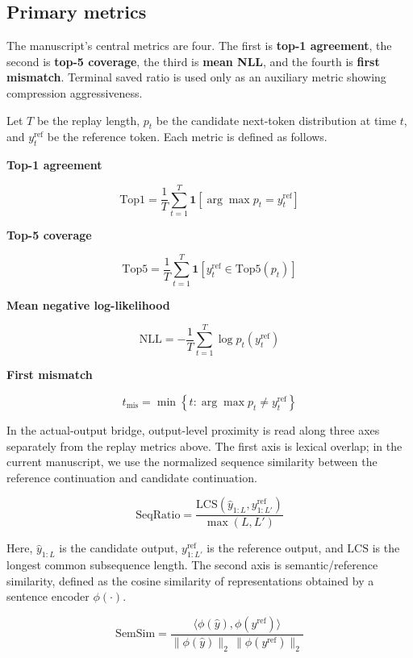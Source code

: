 \subsection{Primary metrics}


The manuscript's central metrics are four. The first is \textbf{top-1 agreement}, the second is \textbf{top-5 coverage}, the third is \textbf{mean NLL}, and the fourth is \textbf{first mismatch}. Terminal saved ratio is used only as an auxiliary metric showing compression aggressiveness.


Let $T$ be the replay length, $p_t$ be the candidate next-token distribution at time $t$, and $y_t^{\mathrm{ref}}$ be the reference token. Each metric is defined as follows.


\textbf{Top-1 agreement}


$$
\mathrm{Top1}
=
\frac{1}{T}
\sum_{t=1}^{T}
\mathbf{1}\left[\arg\max p_t = y_t^{\mathrm{ref}}\right]
$$


\textbf{Top-5 coverage}


$$
\mathrm{Top5}
=
\frac{1}{T}
\sum_{t=1}^{T}
\mathbf{1}\left[y_t^{\mathrm{ref}} \in \mathrm{Top5}(p_t)\right]
$$


\textbf{Mean negative log-likelihood}


$$
\mathrm{NLL}
=
-
\frac{1}{T}
\sum_{t=1}^{T}
\log p_t\left(y_t^{\mathrm{ref}}\right)
$$


\textbf{First mismatch}


$$
t_{\mathrm{mis}}
=
\min \left\{ t : \arg\max p_t \neq y_t^{\mathrm{ref}} \right\}
$$


In the actual-output bridge, output-level proximity is read along three axes separately from the replay metrics above. The first axis is lexical overlap; in the current manuscript, we use the normalized sequence similarity between the reference continuation and candidate continuation.


$$
\mathrm{SeqRatio}
=
\frac{\mathrm{LCS}(\hat{y}_{1:L}, y^{\mathrm{ref}}_{1:L'})}{\max(L,L')}
$$


Here, $\hat{y}_{1:L}$ is the candidate output, $y^{\mathrm{ref}}_{1:L'}$ is the reference output, and $\mathrm{LCS}$ is the longest common subsequence length. The second axis is semantic/reference similarity, defined as the cosine similarity of representations obtained by a sentence encoder $\phi(\cdot)$.


$$
\mathrm{SemSim}
=
\frac{\langle \phi(\hat{y}), \phi(y^{\mathrm{ref}}) \rangle}{\|\phi(\hat{y})\|_2\,\|\phi(y^{\mathrm{ref}})\|_2}
$$


